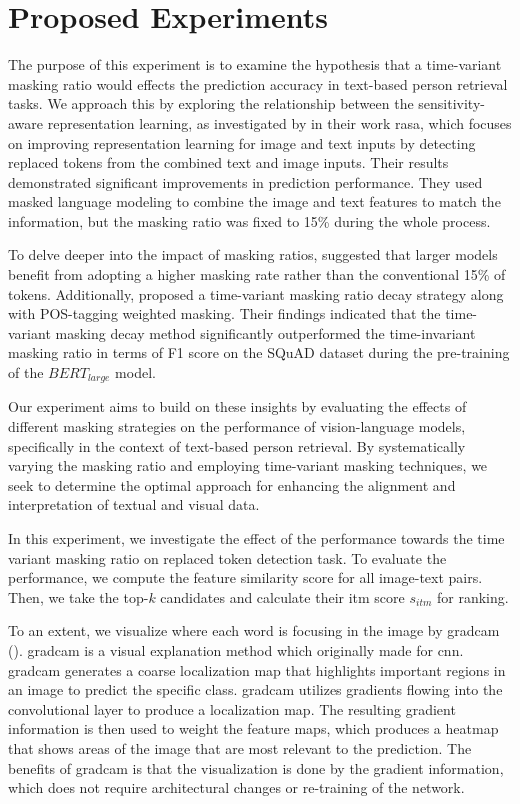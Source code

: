 \chapter{Proposed Experiments}
The purpose of this experiment is to examine the hypothesis that a time-variant masking ratio would effects the prediction accuracy in text-based person retrieval tasks. We approach this by exploring the relationship between the sensitivity-aware representation learning, as investigated by \cite{Bai2023RaSaRA} in their work \acrshort{rasa}, which focuses on improving representation learning for image and text inputs by detecting replaced tokens from the combined text and image inputs. Their results demonstrated significant improvements in prediction performance. They used masked language modeling to combine the image and text features to match the information, but the masking ratio was fixed to 15\% during the whole process.

To delve deeper into the impact of masking ratios, \cite{wettig-etal-2023-mask} suggested that larger models benefit from adopting a higher masking rate rather than the  conventional 15\% of tokens. Additionally, \cite{yang2023learningbettermaskingbetter} proposed a time-variant masking ratio decay strategy along with POS-tagging weighted masking. Their findings indicated that the time-variant masking decay method significantly outperformed the time-invariant masking ratio in terms of F1 score on the SQuAD dataset during the pre-training of the $BERT_{large}$ model.

Our experiment aims to build on these insights by evaluating the effects of different masking strategies on the performance of vision-language models, specifically in the context of text-based person retrieval. By systematically varying the masking ratio and employing time-variant masking techniques, we seek to determine the optimal approach for enhancing the alignment and interpretation of textual and visual data.

In this experiment, we investigate the effect of the performance towards the time variant masking ratio on replaced token detection task. To evaluate the performance, we compute the feature similarity score for all image-text pairs. Then, we take the top-$k$ candidates and calculate their \acrshort{itm} score $s_{itm}$ for ranking. 


To an extent, we visualize where each word is focusing in the image by \acrfull{gradcam} (\cite{gradcam}).
\acrshort{gradcam} is a visual explanation method which originally made for \acrfull{cnn}. \acrshort{gradcam} generates a coarse localization map that highlights important regions in an image to predict the specific class. \acrshort{gradcam} utilizes gradients flowing into the convolutional layer to produce a localization map. The resulting gradient information is then used to weight the feature maps, which produces a heatmap that shows areas of the image that are most relevant to the prediction. The benefits of \acrshort{gradcam} is that the visualization is done by the gradient information, which does not require architectural changes or re-training of the network.

